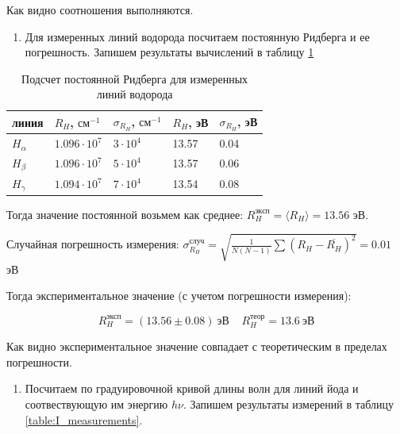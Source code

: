 \documentclass[a4paper,12pt]{article}
\begin{document}
Как видно соотношения выполняются.

\begin{enumerate}[resume]
    \item Для измеренных линий водорода посчитаем постоянную Ридберга и ее погрешность. Запишем результаты вычислений в таблицу \ref{table:H_Ridberg}
\end{enumerate}


\begin{table}[h]
    \centering
    \begin{tabular}{l|l|l|l|l}
        \hline
        линия      & $R_H$, $\text{см}^{-1}$ & $\sigma_{R_H}$, $\text{см}^{-1}$ & $R_H$, эВ & $\sigma_{R_H}$, эВ \\ \hline
        $H_\alpha$ & $1.096 \cdot 10^7$ & $3 \cdot 10^4$ & 13.57 & 0.04 \\
        $H_\beta$  & $1.096 \cdot 10^7$ & $5 \cdot 10^4$ & 13.57 & 0.06 \\
        $H_\gamma$ & $1.094 \cdot 10^7$ & $7 \cdot 10^4$ & 13.54 & 0.08 \\ \hline
    \end{tabular}
    \caption{Подсчет постоянной Ридберга для измеренных линий водорода}
    \label{table:H_Ridberg}
\end{table}

Тогда значение постоянной возьмем как среднее: $R_H^\text{эксп} = \langle R_H \rangle = 13.56$ эВ.

Случайная погрешность измерения: $\sigma_{R_H}^\text{случ} = \sqrt{\frac{1}{N(N - 1)} \sum \left(R_H - \overline{R_H}\right)^2} = 0.01$ эВ

Тогда экспериментальное значение (с учетом погрешности измерения):

\begin{equation*}
    R_H^\text{эксп} = (13.56 \pm 0.08) \ \text{эВ} \ \ \ \ \ R_H^\text{теор} = 13.6 \ \text{эВ}
\end{equation*}

Как видно экспериментальное значение совпадает с теоретическим в пределах погрешности.

\begin{enumerate}[resume]
    \item Посчитаем по градуировочной кривой длины волн для линий йода и соотвествующую им энергию $h \nu$. Запишем результаты измерений в таблицу \ref{table:I_measurements}.
\end{enumerate}
\end{document}
